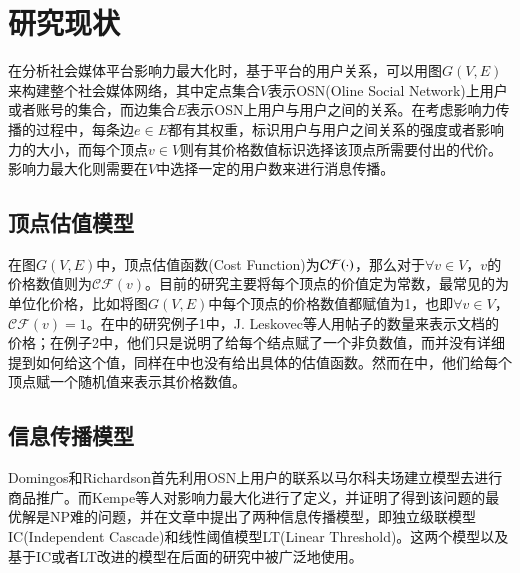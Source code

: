 \section{研究现状}
在分析社会媒体平台影响力最大化时，基于平台的用户关系，可以用图$G(V, E)$来构建整个社会媒体网络，其中定点集合$V$表示OSN(Oline Social Network)上用户或者账号的集合，而边集合$E$表示OSN上用户与用户之间的关系。在考虑影响力传播的过程中，每条边$e \in E$都有其权重，标识用户与用户之间关系的强度或者影响力的大小，而每个顶点$v \in V$则有其价格数值标识选择该顶点所需要付出的代价。影响力最大化则需要在$V$中选择一定的用户数来进行消息传播。


\subsection{顶点估值模型}
在图$G(V, E)$中，顶点估值函数(Cost Function)为$\mathcal{CF}(\boldmath\cdot)$，那么对于$\forall v \in V$，$v$的价格数值则为$\mathcal{CF}(v)$。目前的研究主要将每个顶点的价值定为常数，最常见的为单位化价格，比如\cite{he2012influence}\cite{kempe2003maximizing}\cite{chen2011influence}\cite{chen2010scalable}\cite{chen2009efficient}将图$G(V, E)$中每个顶点的价格数值都赋值为1，也即$\forall v \in V$，$\mathcal{CF}(v) = 1$。在\cite{leskovec2007cost}中的研究例子1中，J. Leskovec等人用帖子的数量来表示文档的价格；在例子2中，他们只是说明了给每个结点赋了一个非负数值，而并没有详细提到如何给这个值，同样在\cite{han2014balanced}中也没有给出具体的估值函数。然而在\cite{nguyen2013budgeted}中，他们给每个顶点赋一个随机值来表示其价格数值。


\subsection{信息传播模型}
Domingos\cite{domingos2001mining}和Richardson\cite{richardson2002mining}首先利用OSN上用户的联系以马尔科夫场建立模型去进行商品推广。而Kempe\cite{kempe2003maximizing}等人对影响力最大化进行了定义，并证明了得到该问题的最优解是NP难的问题，并在文章中提出了两种信息传播模型，即独立级联模型IC(Independent Cascade)和线性阈值模型LT(Linear Threshold)。这两个模型以及基于IC或者LT改进的模型在后面的研究中被广泛地使用。


